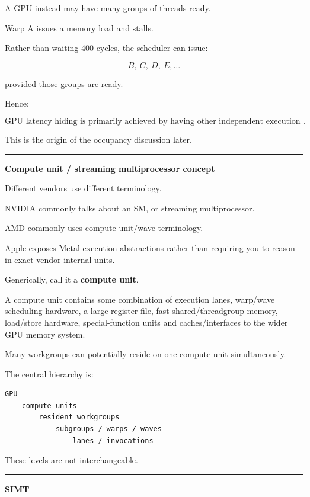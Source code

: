 A GPU instead may have many groups of threads ready.

Warp A issues a memory load and stalls.

Rather than waiting 400 cycles, the scheduler can issue:

\[
B,\ C,\ D,\ E,\dots
\]

provided those groups are ready.

Hence:

\[
\boxed{
\text{GPU latency hiding is primarily achieved by having other independent execution groups resident}.
}
\]

This is the origin of the occupancy discussion later.

\begin{center}\rule{0.5\linewidth}{0.5pt}\end{center}

\textbf{Compute unit / streaming multiprocessor concept}

Different vendors use different terminology.

NVIDIA commonly talks about an SM, or streaming multiprocessor.

AMD commonly uses compute-unit/wave terminology.

Apple exposes Metal execution abstractions rather than requiring you to reason in exact vendor-internal units.

Generically, call it a \textbf{compute unit}.

A compute unit contains some combination of execution lanes, warp/wave scheduling hardware, a large register file, fast shared/threadgroup memory, load/store hardware, special-function units and caches/interfaces to the wider GPU memory system.

Many workgroups can potentially reside on one compute unit simultaneously.

The central hierarchy is:

\protect{}\label{5kw7e9}%
\begin{verbatim}
GPU
    compute units
        resident workgroups
            subgroups / warps / waves
                lanes / invocations
\end{verbatim}

These levels are not interchangeable.

\begin{center}\rule{0.5\linewidth}{0.5pt}\end{center}

\textbf{SIMT}

